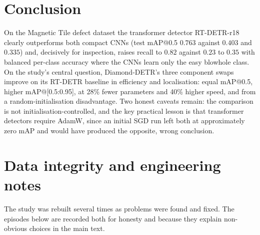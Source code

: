 \documentclass[11pt,a4paper]{article}
\begin{document}
\section{Conclusion}
On the Magnetic Tile defect dataset the transformer detector RT-DETR-r18 clearly outperforms both
compact CNNs (test mAP@0.5 $0.763$ against $0.403$ and $0.335$) and, decisively for inspection,
raises recall to $0.82$ against $0.23$ to $0.35$ with balanced per-class accuracy where the CNNs
learn only the easy blowhole class. On the study's central question, Diamond-DETR's three component
swaps improve on its RT-DETR baseline in efficiency and localisation: equal mAP@0.5, higher
mAP@[0.5:0.95], at 28\% fewer parameters and 40\% higher speed, and from a random-initialisation
disadvantage. Two honest caveats remain: the comparison is not initialisation-controlled, and the
key practical lesson is that transformer detectors require AdamW, since an initial SGD run left both
at approximately zero mAP and would have produced the opposite, wrong conclusion.

\appendix
\section{Data integrity and engineering notes}\label{app:integrity}
The study was rebuilt several times as problems were found and fixed. The episodes below are
recorded both for honesty and because they explain non-obvious choices in the main text.
\end{document}

